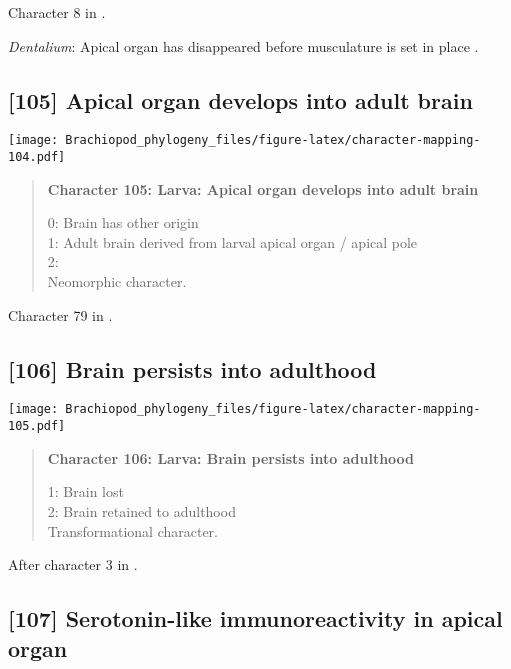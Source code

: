 \documentclass[openany]{book}
\theoremstyle{definition}
\theoremstyle{definition}
\theoremstyle{definition}
\theoremstyle{remark}
\begin{document}
Character 8 in \citet{Vinther2008}.

\hypertarget{Dentalium-coding-104}{}
\emph{Dentalium}: Apical organ has disappeared before musculature is set
in place \citep{Wanninger2002M}.

\subsection*{{[}105{]} Apical organ develops into adult
brain}\label{apical-organ-develops-into-adult-brain}

\texttt{[image: Brachiopod\_phylogeny\_files/figure-latex/character-mapping-104.pdf]}

\begin{quote}
\textbf{Character 105: Larva: Apical organ develops into adult brain}

0: Brain has other origin\\
1: Adult brain derived from larval apical organ / apical pole\\
2:\\
Neomorphic character.
\end{quote}

Character 79 in \citet{Glenner2004}.

\subsection*{{[}106{]} Brain persists into
adulthood}\label{brain-persists-into-adulthood}

\texttt{[image: Brachiopod\_phylogeny\_files/figure-latex/character-mapping-105.pdf]}

\begin{quote}
\textbf{Character 106: Larva: Brain persists into adulthood}

1: Brain lost\\
2: Brain retained to adulthood\\
Transformational character.
\end{quote}

After character 3 in \citet{Richter2010}.

\subsection*{{[}107{]} Serotonin-like immunoreactivity in apical
organ}\label{serotonin-like-immunoreactivity-in-apical-organ}
\end{document}
